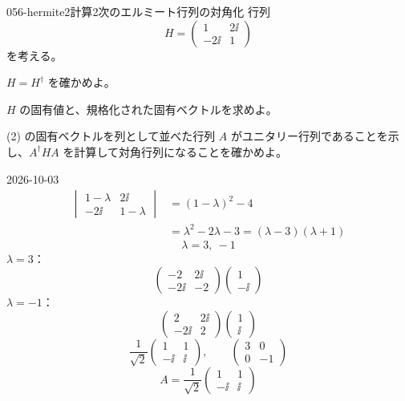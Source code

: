\documentclass[uplatex,dvipdfmx,a4paper,11pt]{jsarticle}
\begin{document}
\begin{mondai}{056-hermite2}{計算}{2次のエルミート行列の対角化}
行列
\[
H=\begin{pmatrix}1&2\ii\\-2\ii&1\end{pmatrix}
\]
を考える。
\begin{shoumon}
  \item $H=H^{\dagger}$ を確かめよ。
  \item $H$ の固有値と、規格化された固有ベクトルを求めよ。
  \item (2) の固有ベクトルを列として並べた行列 $A$ がユニタリー行列であることを示し、$A^{\dagger}HA$ を計算して対角行列になることを確かめよ。
\end{shoumon}
\begin{kotaeutsushi}{2026-10-03}
\mikai
{}
\begin{align*}
  \begin{vmatrix}1-\lambda&2\ii\\-2\ii&1-\lambda\end{vmatrix}&=(1-\lambda)^{2}-4\\
  &=\lambda^{2}-2\lambda-3=(\lambda-3)(\lambda+1)
\end{align*}
\[ \lambda=3,\ -1 \]
$\lambda=3$：
\[ \begin{pmatrix}-2&2\ii\\-2\ii&-2\end{pmatrix}\begin{pmatrix}1\\-\ii\end{pmatrix} \]
$\lambda=-1$：
\[ \begin{pmatrix}2&2\ii\\-2\ii&2\end{pmatrix}\begin{pmatrix}1\\\ii\end{pmatrix} \]
\[
  \frac{1}{\sqrt{2}}\begin{pmatrix}1&1\\-\ii&\ii\end{pmatrix},\qquad \begin{pmatrix}3&0\\0&-1\end{pmatrix}
\]
\[
  A=\frac{1}{\sqrt{2}}\begin{pmatrix}1&1\\-\ii&\ii\end{pmatrix}
\]
\end{kotaeutsushi}
\end{mondai}
\end{document}
